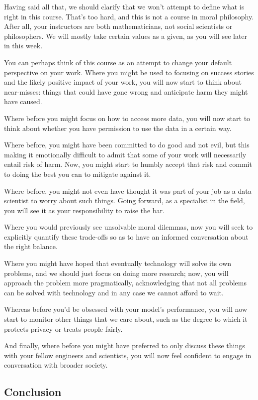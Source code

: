 \documentclass[
]{book}
\theoremstyle{definition}
\theoremstyle{definition}
\theoremstyle{definition}
\theoremstyle{definition}
\theoremstyle{remark}
\begin{document}
Having said all that, we should clarify that we won't attempt to define what is right in this course. That's too hard, and this is not a course in moral philosophy. After all, your instructors are both mathematicians, not social scientists or philosophers. We will mostly take certain values as a given, as you will see later in this week.

You can perhaps think of this course as an attempt to change your default perspective on your work. Where you might be used to focusing on success stories and the likely positive impact of your work, you will now start to think about near-misses: things that could have gone wrong and anticipate harm they might have caused.

Where before you might focus on how to access more data, you will now start to think about whether you have permission to use the data in a certain way.

Where before, you might have been committed to do good and not evil, but this making it emotionally difficult to admit that some of your work will necessarily entail risk of harm. Now, you might start to humbly accept that risk and commit to doing the best you can to mitigate against it.

Where before, you might not even have thought it was part of your job as a data scientist to worry about such things. Going forward, as a specialist in the field, you will see it as your responsibility to raise the bar.

Where you would previously see unsolvable moral dilemmas, now you will seek to explicitly quantify these trade-offs so as to have an informed conversation about the right balance.

Where you might have hoped that eventually technology will solve its own problems, and we should just focus on doing more research; now, you will approach the problem more pragmatically, acknowledging that not all problems can be solved with technology and in any case we cannot afford to wait.

Whereas before you'd be obsessed with your model's performance, you will now start to monitor other things that we care about, such as the degree to which it protects privacy or treats people fairly.

And finally, where before you might have preferred to only discuss these things with your fellow engineers and scientists, you will now feel confident to engage
in conversation with broader society.

\hypertarget{conclusion}{%
\subsection{Conclusion}\label{conclusion}}
\end{document}
